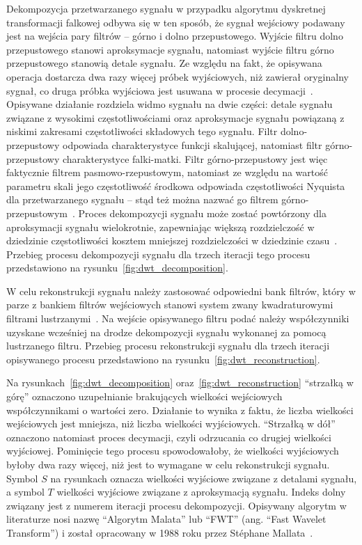 Dekompozycja przetwarzanego sygnału w przypadku algorytmu dyskretnej transformacji falkowej odbywa się w ten sposób, że sygnał wejściowy podawany jest na wejścia pary filtrów -- górno i dolno przepustowego. Wyjście filtru dolno przepustowego stanowi aproksymacje sygnału, natomiast wyjście filtru górno przepustowego stanowią detale sygnału. Ze względu na fakt, że opisywana operacja dostarcza dwa razy więcej próbek wyjściowych, niż zawierał oryginalny sygnał, co druga próbka wyjściowa jest usuwana w procesie decymacji~\cite{lord_guide}. Opisywane działanie rozdziela widmo sygnału na dwie części: detale sygnału związane z wysokimi częstotliwościami oraz aproksymacje sygnału powiązaną z niskimi zakresami częstotliwości składowych tego sygnału. Filtr dolno-przepustowy odpowiada charakterystyce funkcji skalującej, natomiast filtr górno-przepustowy charakterystyce falki-matki. Filtr górno-przepustowy jest więc faktycznie filtrem pasmowo-rzepustowym, natomiast ze względu na wartość parametru skali jego częstotliwość środkowa odpowiada częstotliwości Nyquista dla przetwarzanego sygnału -- stąd też można nazwać go filtrem górno-przepustowym~\cite{ahmad_wavelet}. Proces dekompozycji sygnału może zostać powtórzony dla aproksymacji sygnału wielokrotnie, zapewniając większą rozdzielczość w dziedzinie częstotliwości kosztem mniejszej rozdzielczości w dziedzinie czasu~\cite{vonesch_dbbasics}. Przebieg procesu dekompozycji sygnału dla trzech iteracji tego procesu przedstawiono na rysunku~\ref{fig:dwt_decomposition}.

W celu rekonstrukcji sygnału należy zastosować odpowiedni bank filtrów, który w parze z bankiem filtrów wejściowych stanowi system zwany kwadraturowymi filtrami lustrzanymi~\cite{johnston_filter}. Na wejście opisywanego filtru podać należy współczynniki uzyskane wcześniej na drodze dekompozycji sygnału wykonanej za pomocą lustrzanego filtru. Przebieg procesu rekonstrukcji sygnału dla trzech iteracji opisywanego procesu przedstawiono na rysunku~\ref{fig:dwt_reconstruction}.

Na rysunkach~\ref{fig:dwt_decomposition} oraz~\ref{fig:dwt_reconstruction} \enquote{strzałką w górę} oznaczono uzupełnianie brakujących wielkości wejściowych współczynnikami o wartości zero. Działanie to wynika z faktu, że liczba wielkości wejściowych jest mniejsza, niż liczba wielkości wyjściowych. \enquote{Strzałką w dół} oznaczono natomiast proces decymacji, czyli odrzucania co drugiej wielkości wyjściowej. Pominięcie tego procesu spowodowałoby, że wielkości wyjściowych byłoby dwa razy więcej, niż jest to wymagane w celu rekonstrukcji sygnału. Symbol $S$ na rysunkach oznacza wielkości wyjściowe związane z detalami sygnału, a symbol $T$ wielkości wyjściowe związane z aproksymacją sygnału. Indeks dolny związany jest z numerem iteracji procesu dekompozycji. Opisywany algorytm w literaturze nosi nazwę \enquote{Algorytm Malata} lub \enquote{FWT} (ang. \enquote{Fast Wavelet Transform}) i został opracowany w 1988 roku przez Stéphane Mallata~\cite{lujian_mallat}.

